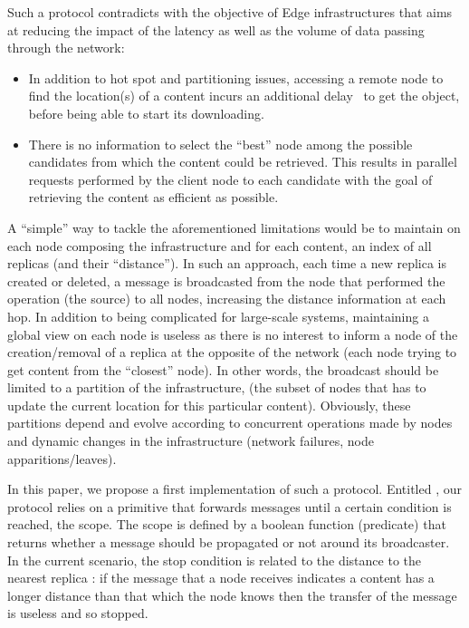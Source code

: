 Such a protocol contradicts with the objective of Edge
infrastructures that aims at reducing the impact of the
latency as well as the volume of data passing through the network:
\begin{itemize}
  \item In addition to hot spot and partitioning issues, accessing a
    remote node to find the location(s) of a content incurs an
    additional delay~\cite{asrese2019measuring, doan2019tracing} to
    get the object, before being able to start its downloading.
  \item There is no information to select the ``best'' node among the
     possible candidates from which the content  could be
     retrieved. This results in parallel requests performed by the client node to
     each candidate with the goal of retrieving the content as efficient
     as possible.
\end{itemize}    

A ``simple'' way to tackle the aforementioned limitations would be to
maintain on each node composing the infrastructure and for each
content, an index of all replicas (and their ``distance'').  In such
an approach, each time a new replica is created or deleted, a message
is broadcasted from the node that performed the operation (\ie the
source) to all nodes, increasing the distance information at each hop.
%
In addition to being complicated for large-scale systems, maintaining
a global view on each node is useless as there is no interest to
inform a node of the creation/removal of a replica at the opposite of
the network (each node trying to get content from the ``closest''
node).  In other words, the broadcast should be limited to a partition
of the infrastructure, (\ie the subset of nodes that has to update the
current location for this particular content). Obviously, these
partitions depend and evolve according to concurrent operations made by nodes and
dynamic changes in the infrastructure (network failures, node
apparitions/leaves).

In this paper, we propose a first implementation of such a protocol.
Entitled \NAME, our protocol relies on a primitive that forwards
messages until a certain condition is reached, \ie the scope. The
scope is defined by a boolean function (predicate) that returns
whether a message should be propagated or not around its
broadcaster. In the current scenario, the stop condition is related to
the distance to the nearest replica : if the message that a node receives
indicates a content has a longer distance than that which the node
knows then the transfer of the message is useless and so stopped.
%

